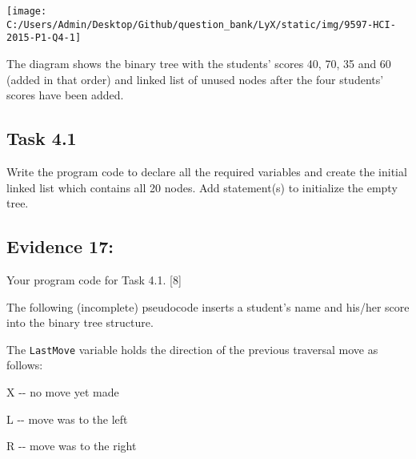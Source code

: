 \begin{center}
\texttt{[image: C:/Users/Admin/Desktop/Github/question\_bank/LyX/static/img/9597-HCI-2015-P1-Q4-1]}
\par\end{center}

The diagram shows the binary tree with the students\textquoteright{}
scores 40, 70, 35 and 60 (added in that order) and linked list of
unused nodes after the four students\textquoteright{} scores have
been added. 

\subsection*{Task 4.1 }

Write the program code to declare all the required variables and create
the initial linked list which contains all 20 nodes. Add statement(s)
to initialize the empty tree. 

\subsection*{Evidence 17: }

Your program code for Task 4.1. {[}8{]} 

The following (incomplete) pseudocode inserts a student\textquoteright s
name and his/her score into the binary tree structure. 

The \texttt{LastMove} variable holds the direction of the previous
traversal move as follows: 

X -{}- no move yet made 

L -{}- move was to the left

R -{}- move was to the right 

